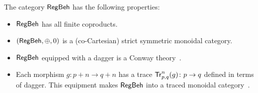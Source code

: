 \begin{theorem}
	The category $\mathsf{RegBeh}$ has the following properties:
	\begin{itemize}
		\item $\mathsf{RegBeh}$ has all finite coproducts. 
		\item $(\mathsf{RegBeh}, \oplus, 0)$ is a (co-Cartesian) strict symmetric monoidal category.
		\item $\mathsf{RegBeh}$ equipped with a dagger is a Conway theory~\cite{Esik:1999:Group}.
		\item Each morphism $g \colon p + n \to q + n$ has a trace $\mathsf{Tr}^{n}_{p,q}(g) \colon p \to q$ defined in terms of dagger. This equipment makes $\mathsf{RegBeh}$ into a traced monoidal category~\cite{Joyal:1996:Traced}. 
	\end{itemize}
\end{theorem} 
 